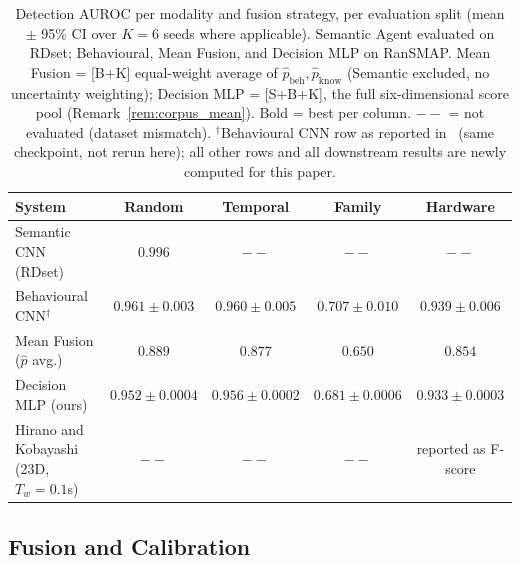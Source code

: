 \documentclass[journal]{IEEEtran}
\begin{document}
\begin{table}[t]
\centering
\footnotesize
\caption{Detection AUROC per modality and fusion strategy, per evaluation split
  (mean $\pm$ 95\% CI over $K{=}6$ seeds where applicable).
  Semantic Agent evaluated on RDset; Behavioural, Mean Fusion, and Decision
  MLP on RanSMAP. Mean Fusion = [B+K] equal-weight average of
  $\hat{p}_{\text{beh}}, \hat{p}_{\text{know}}$ (Semantic excluded, no
  uncertainty weighting); Decision MLP = [S+B+K], the full six-dimensional
  score pool (Remark~\ref{rem:corpus_mean}).
  Bold = best per column.
  $--$ = not evaluated (dataset mismatch).
  ${}^\dagger$Behavioural CNN row as reported
  in~\cite{kabuye2026sabre} (same checkpoint, not rerun here); all
  other rows and all downstream results are newly computed for this
  paper.
}
\label{tab:auroc_splits}
\setlength{\tabcolsep}{5pt}
\begin{tabular}{lcccc}
\toprule
System & Random & Temporal & Family & Hardware \\
\midrule
Semantic CNN (RDset)
  & $\mathbf{0.996}$ & $--$ & $--$ & $--$ \\
Behavioural CNN${}^\dagger$
  & $\mathbf{0.961} \pm 0.003$ & $\mathbf{0.960} \pm 0.005$ & $\mathbf{0.707} \pm 0.010$ & $\mathbf{0.939} \pm 0.006$ \\
Mean Fusion ($\hat{p}$ avg.)
  & $0.889$ & $0.877$ & $0.650$ & $0.854$ \\
Decision MLP (ours)
  & $0.952 \pm 0.0004$ & $0.956 \pm 0.0002$
  & $0.681 \pm 0.0006$ & $0.933 \pm 0.0003$ \\
\midrule
Hirano and Kobayashi~\cite{hirano2025ransmap}
  (23D, $T_w{=}0.1$s)
  & $--$ & $--$ & $--$ & reported as F-score \\
\bottomrule
\end{tabular}
\end{table}

\subsection{Fusion and Calibration}\label{sec:results_fusion}
\end{document}
